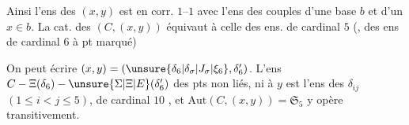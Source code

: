 Ainsi l'ens des   $(x,y)$  est en corr. $1$--$1$ avec l'ens des couples d'une base $b$ et d'un $x\in b$. La cat. des $(C,(x,y))$ équivaut à celle des ens. de cardinal $5$ (, des ens de cardinal $6$ à pt marqué)

On peut écrire $(x,y)=(\unsure{\delta_6|\delta_\sigma|J_\sigma|\xi_6},\delta'_6)$. L'ens $C-\Xi(\delta_6)-\unsure{\Sigma|\Xi|E}(\delta'_6)$  des pts  non liés, ni à $y$ est l'ens des $\delta_{ij}$ $(1\leq i<j\leq5)$, de cardinal $10$ , et $\mathrm{Aut}(C,(x,y))=\mathfrak S_5$ y opère transitivement.
